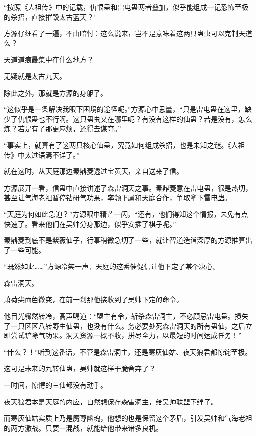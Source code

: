 
\begin{this_body}

“按照《人祖传》中的记载，仇恨蛊和雷电蛊两者叠加，似乎能组成一记恐怖至极的杀招，直接摧毁太古蓝天？”

方源仔细看了一遍，不由暗忖：这么说来，岂不是意味着这两只蛊虫可以克制天道么？

天道道痕最集中在什么地方？

无疑就是太古九天。

除此之外，那就是方源的身躯了。

“这似乎是一条解决我眼下困境的途径呢。”方源心中思量，“只是雷电蛊在这里，缺少了仇恨蛊也不行啊。这只蛊虫又在哪里呢？有没有这样的仙蛊？若是没有，怎么炼？若是有了那更麻烦，还得去谋夺。”

“事实上，就算有了这两只核心仙蛊，究竟如何组成杀招，也是未知之谜。《人祖传》中太过语焉不详了。”

就在这时，从天庭那边秦鼎菱透过宝黄天，亲自送来了信。

方源展开一看，信蛊中直接讲述了森雷洞天之事。秦鼎菱意在雷电蛊，很是热切，甚至让气海老祖暂停钻研气功果，率领下属和天庭合作，争取拿下雷电蛊。

“天庭为何如此急迫？”方源眼中精芒一闪，“还有，他们得知这个情报，未免有点快速了。看来他们在吴帅分身那边，似乎安插了棋子呢。”

秦鼎菱到底不是紫薇仙子，行事稍微急切了一些，就让智道造诣深厚的方源推算出了一些可能。

“既然如此……”方源冷笑一声，天庭的这番催促信让他下定了某个决心。

森雷洞天。

萧荷尖面色微变，在前一刹那他接收到了吴帅下定的命令。

他目光骤然转冷，高声喝道：“盟主有令，斩杀森雷洞主，不必顾忌雷电蛊。损失了一只区区八转野生仙蛊，也没有什么。务必要处死森雷洞天的所有蛊仙，之后立即尝试铲除气功果。洞天资源一概不收，拼尽全力，以最短的时间达成任务！”

“什么？！”听到这番话，不管是森雷洞主，还是寒灰仙姑、夜天狼君都惊诧至极。

这可是未来的九转仙蛊，吴帅就这样干脆舍弃了？

一时间，惊愕的三仙都没有动手。

夜天狼君本是天庭的内应，自然想保存森雷洞主，给吴帅联盟下绊子。

而寒灰仙姑实质上乃是魔尊幽魂，他想的也是保留这个矛盾，引发吴帅和气海老祖的两方激战。只要一混战，就能给他带来诸多良机。


\end{this_body}

